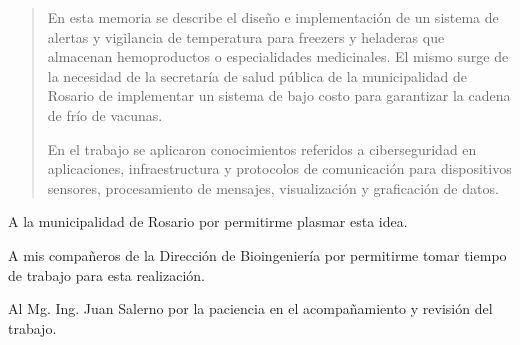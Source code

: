 \documentclass[
11pt, %
spanish,
singlespacing, %
parskip, %
codirector, %
headsepline, %
]{MastersDoctoralThesis} %
\author{Juan Perez} %
\begin{document}
\frontmatter %

\pagestyle{plain} %



\begin{abstract}
\addchaptertocentry{\abstractname} %
%
\centering

En esta memoria se describe el diseño e implementación de un sistema de alertas y vigilancia de temperatura para freezers y heladeras que almacenan hemoproductos o especialidades medicinales. El mismo surge de la necesidad de la secretaría de salud pública de la municipalidad de Rosario de implementar un sistema de bajo costo para garantizar la cadena de frío de vacunas.

En el trabajo se aplicaron conocimientos referidos a ciberseguridad en aplicaciones, infraestructura y protocolos de comunicación para dispositivos sensores, procesamiento de mensajes, visualización y graficación de datos. 

\end{abstract}


\begin{acknowledgements}
\vspace{1.5cm}

A la municipalidad de Rosario por permitirme plasmar esta idea.

A mis compañeros de la Dirección de Bioingeniería por permitirme tomar tiempo de trabajo para esta realización.

Al Mg. Ing. Juan Salerno por la paciencia en el acompañamiento y revisión del trabajo.  

\end{acknowledgements}
\end{document}
